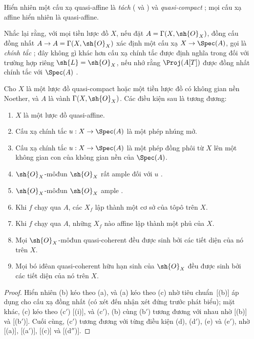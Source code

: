 \documentclass[oneside,10pt]{amsart}
\makeatletter
\newcommand{\ega@arrow}[2]{\mathchoice{#1}{#2}{#2}{#2}}
\renewcommand{\to}{\ega@arrow{\longrightarrow}{\rightarrow}}
\newcommand{\oldpage}[2][]{\marginnote{\normalfont\footnotesize\textbf{#1}~|~#2}\ignorespaces}
\let\EGAOriginalLabel\label
\renewcommand{\label}[1]{\phantomsection\EGAOriginalLabel{#1}}
\makeatother
\begin{document}
Hiển nhiên một cấu xạ quasi-affine là \emph{tách} ( và ) và \emph{quasi-compact} ;
mọi cấu xạ affine hiển nhiên là quasi-affine.

Nhắc lại rằng, với mọi tiền lược đồ $X$, nếu đặt $A=\Gamma(X,\sh{O}_X)$, đồng cấu đồng nhất $A\to A=\Gamma(X,\sh{O}_X)$ xác định một cấu xạ $X\to\Spec(A)$, gọi là \emph{chính tắc} ;
đây không gì khác hơn cấu xạ chính tắc được định nghĩa trong  đối với trường hợp riêng $\sh{L}=\sh{O}_X$, nếu nhớ rằng $\Proj(A[T])$ được đồng nhất chính tắc với $\Spec(A)$ .

\begin{proposition}[5.1.2]
\label{II.5.1.2}
Cho $X$ là một lược đồ quasi-compact hoặc một tiền lược đồ có không gian nền Noether, và $A$ là vành $\Gamma(X,\sh{O}_X)$.
Các điều kiện sau là tương đương:
\begin{enumerate}
  \item[{\rm(a)}] $X$ là một lược đồ quasi-affine.
  \item[{\rm(b)}] Cấu xạ chính tắc $u:X\to\Spec(A)$ là một phép nhúng mở.
  \item[{\rm(b')}] Cấu xạ chính tắc $u:X\to\Spec(A)$ là một phép đồng phôi từ $X$ lên một không gian con của không gian nền của $\Spec(A)$.
  \item[{\rm(c)}] $\sh{O}_X$-môđun $\sh{O}_X$ rất ample đối với $u$ .
  \item[{\rm(c')}] $\sh{O}_X$-môđun $\sh{O}_X$ ample .
  \item[{\rm(d)}] Khi $f$ chạy qua $A$, các $X_f$ lập thành một cơ sở của tôpô trên $X$.
  \item[{\rm(d')}] Khi $f$ chạy qua $A$, những $X_f$ nào affine lập thành một phủ của $X$.
\oldpage[II]{95}
  \item[{\rm(e)}] Mọi $\sh{O}_X$-môđun quasi-coherent đều được sinh bởi các tiết diện của nó trên $X$.
  \item[{\rm(e')}] Mọi bó iđêan quasi-coherent hữu hạn sinh của $\sh{O}_X$ đều được sinh bởi các tiết diện của nó trên $X$.
\end{enumerate}
\end{proposition}

\begin{proof}
Hiển nhiên (b) kéo theo (a), và (a) kéo theo (c) nhờ tiêu chuẩn~[(b)] áp dụng cho cấu xạ đồng nhất (có xét đến nhận xét đứng trước phát biểu);
mặt khác, (c) kéo theo (c$'$) [(i)], và (c$'$), (b) cùng (b$'$) tương đương với nhau nhờ [(b)] và [(b$'$)].
Cuối cùng, (c$'$) tương đương với từng điều kiện (d), (d$'$), (e) và (e$'$), nhờ [(a)], [(a$'$)], [(c)] và [(d$''$)].
\end{proof}
\end{document}
